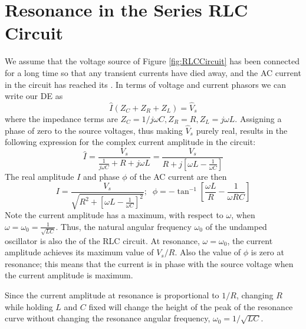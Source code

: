 \documentclass[12pt, a4paper, oneside, openright, titlepage]{book}
\begin{document}
\section{Resonance in the Series RLC Circuit}

We assume that the voltage source of Figure \ref{fig:RLCCircuit} has been connected for a long time so that any transient currents have died away, and the AC current in the circuit has reached its . In terms of voltage and current phasors we can write our DE as \begin{equation*}
    \hat{I}(Z_C+Z_R+Z_L) = \hat{V}_s
\end{equation*}
where the impedance terms are $Z_C = 1/j\omega C, Z_R = R, Z_L = j\omega L$. Assigning a phase of zero to the source voltages, thus making $\hat{V}_s$ purely real, results in the following expression for the complex current amplitude in the circuit: \begin{equation*}
    \hat{I} = \frac{V_s}{\frac{1}{j\omega C}+R+j\omega L} = \frac{V_s}{R + j\left[\omega L - \frac{1}{\omega C}\right]}
\end{equation*}
The real amplitude $I$ and phase $\phi$ of the AC current are then \begin{equation*}
    I = \frac{V_s}{\sqrt{R^2 + \left[\omega L - \frac{1}{\omega C}\right]^2}};\;\;\phi = -\tan^{-1}\left[\frac{\omega L}{R} - \frac{1}{\omega RC}\right]
\end{equation*}
Note the current amplitude has a maximum, with respect to $\omega$, when $\omega = \omega_0 = \frac{1}{\sqrt{LC}}$. Thus, the natural angular frequency $\omega_0$ of the undamped oscillator is also the  of the RLC circuit. At resonance, $\omega = \omega_0$, the current amplitude achieves its maximum value of $V_s/R$. Also the value of $\phi$ is zero at resonance; this means that the current is in phase with the source voltage when the current amplitude is maximum.

Since the current amplitude at resonance is proportional to $1/R$, changing $R$ while holding $L$ and $C$ fixed will change the height of the peak of the resonance curve without changing the resonance angular frequency, $\omega_0 = 1/\sqrt{LC}$.
\end{document}
